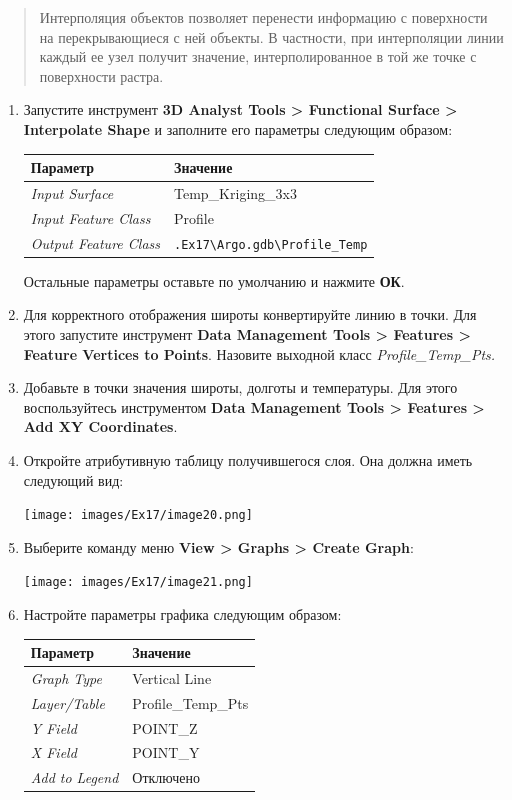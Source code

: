 \documentclass[12pt,]{book}
\begin{document}
\begin{quote}
Интерполяция объектов позволяет перенести информацию с поверхности на перекрывающиеся с ней объекты. В частности, при интерполяции линии каждый ее узел получит значение, интерполированное в той же точке с поверхности растра.
\end{quote}

\begin{enumerate}
\def\labelenumi{\arabic{enumi}.}
\item
  Запустите инструмент \textbf{3D Analyst Tools \textgreater{} Functional Surface \textgreater{} Interpolate Shape} и заполните его параметры следующим образом:

  \begin{longtable}[]{@{}ll@{}}
  \toprule
  Параметр & Значение\tabularnewline
  \midrule
  \endhead
  \emph{Input Surface} & Temp\_Kriging\_3x3\tabularnewline
  \emph{Input Feature Class} & Profile\tabularnewline
  \emph{Output Feature Class} & \texttt{.Ex17\textbackslash{}Argo.gdb\textbackslash{}Profile\_Temp}\tabularnewline
  \bottomrule
  \end{longtable}

  Остальные параметры оставьте по умолчанию и нажмите \textbf{ОК}.
\item
  Для корректного отображения широты конвертируйте линию в точки. Для этого запустите инструмент \textbf{Data Management Tools \textgreater{} Features \textgreater{} Feature Vertices to Points}. Назовите выходной класс \emph{Profile\_Temp\_Pts.}
\item
  Добавьте в точки значения широты, долготы и температуры. Для этого воспользуйтесь инструментом \textbf{Data Management Tools \textgreater{} Features \textgreater{} Add XY Coordinates}.
\item
  Откройте атрибутивную таблицу получившегося слоя. Она должна иметь следующий вид:

  \texttt{[image: images/Ex17/image20.png]}
\item
  Выберите команду меню \textbf{View \textgreater{} Graphs \textgreater{} Create Graph}:

  \texttt{[image: images/Ex17/image21.png]}
\item
  Настройте параметры графика следующим образом:

  \begin{longtable}[]{@{}ll@{}}
  \toprule
  Параметр & Значение\tabularnewline
  \midrule
  \endhead
  \emph{Graph Type} & Vertical Line\tabularnewline
  \emph{Layer/Table} & Profile\_Temp\_Pts\tabularnewline
  \emph{Y Field} & POINT\_Z\tabularnewline
  \emph{X Field} & POINT\_Y\tabularnewline
  \emph{Add to Legend} & Отключено\tabularnewline
  \bottomrule
  \end{longtable}


\end{enumerate}
\end{document}
